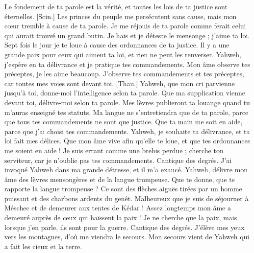 \begin{multicols}{2}
Le fondement de ta parole est la vérité, et toutes les lois de ta justice sont éternelles.
[Scin.] Les princes du peuple me persécutent sans cause, mais mon cœur tremble à cause de ta parole.
Je me réjouis de ta parole comme ferait celui qui aurait trouvé un grand butin.
Je hais et je déteste le mensonge ; j'aime ta loi.
Sept fois le jour je te loue à cause des ordonnances de ta justice.
Il y a une grande paix pour ceux qui aiment ta loi, et rien ne peut les renverser.
Yahweh, j'espère en ta délivrance et je pratique tes commandements.
Mon âme observe tes préceptes, je les aime beaucoup.
J'observe tes commandements et tes préceptes, car toutes mes voies sont devant toi.
[Thau.] Yahweh, que mon cri parvienne jusqu’à toi, donne-moi l’intelligence selon ta parole.
Que ma supplication vienne devant toi, délivre-moi selon ta parole.
Mes lèvres publieront ta louange quand tu m'auras enseigné tes statuts.
Ma langue ne s'entretiendra que de ta parole, parce que tous tes commandements ne sont que justice.
Que ta main me soit en aide, parce que j'ai choisi tes commandements.
Yahweh, je souhaite ta délivrance, et ta loi fait mes délices.
Que mon âme vive afin qu'elle te loue, et que tes ordonnances me soient en aide !
Je suis errant comme une brebis perdue ; cherche ton serviteur, car je n'oublie pas tes commandements.
\VerseOne{}Cantique des degrés. J'ai invoqué Yahweh dans ma grande détresse, et il m'a exaucé.
Yahweh, délivre mon âme des lèvres mensongères et de la langue trompeuse.
Que te donne, que te rapporte la langue trompeuse ?
Ce sont des flèches aiguës tirées par un homme puissant et des charbons ardents du genêt.
Malheureux que je suis de séjourner à Méschec et de demeurer aux tentes de Kédar !
Assez longtemps mon âme a demeuré auprès de ceux qui haïssent la paix !
Je ne cherche que la paix, mais lorsque j'en parle, ils sont pour la guerre.
\VerseOne{}Cantique des degrés. J'élève mes yeux vers les montagnes, d'où me viendra le secours.
Mon secours vient de Yahweh qui a fait les cieux et la terre.

\end{multicols}
